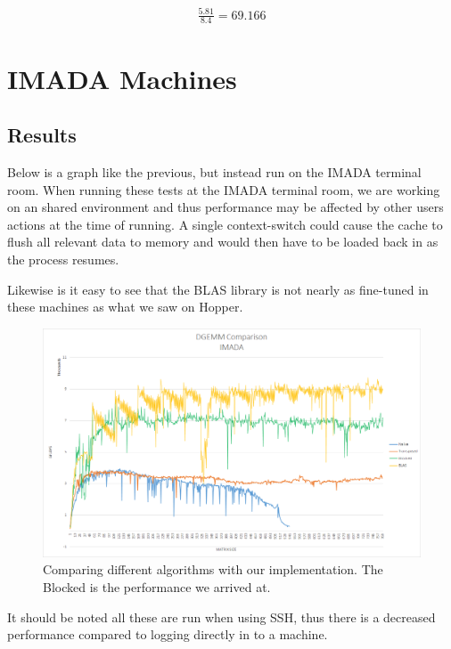 \documentclass[a4paper.11pt,oneside]{book}
\begin{document}
\begin{align*}
\frac{5.81}{8.4} = 69.166%
\end{align*}

\section{IMADA Machines}
\subsection{Results}

Below is a graph like the previous, but instead run on the IMADA terminal room.
When running these tests at the IMADA terminal room, we are working on an shared
environment and thus performance may be affected by other users actions at the
time of running. A single context-switch could cause the cache to flush all
relevant data to memory and would then have to be loaded back in as the process
resumes.

Likewise is it easy to see that the BLAS library is not nearly as fine-tuned in
these machines as what we saw on Hopper.

\begin{figure}[H]
  \centering
  \includegraphics[width=0.9\linewidth]{comparison-graph-imada.png}
  \caption{Comparing different algorithms with our implementation. The Blocked 
           is the performance we arrived at.}
  \centering
  \label{fig:sub1}
\end{figure}

It should be noted all these are run when using SSH, thus there is a decreased
performance compared to logging directly in to a machine.
\end{document}
